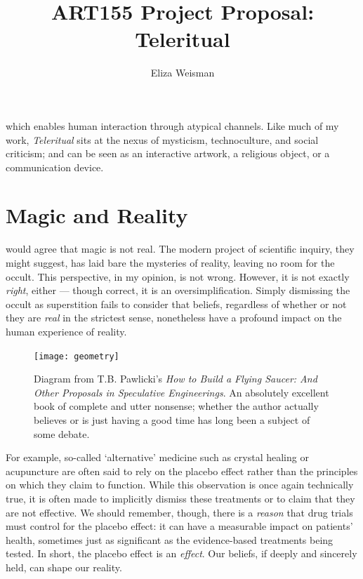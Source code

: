 \documentclass[a4paper,nobib]{tufte-handout}
\title[Teleritual]{\textbf{ART155 Project Proposal:} Teleritual}
\author{Eliza Weisman}
\begin{document}
\maketitle

 which enables human interaction through atypical channels. Like much of my work, \textit{Teleritual} sits at the nexus of mysticism, technoculture, and social criticism; and can be seen as an interactive artwork, a religious object, or a communication device.


\section{Magic and Reality}

 would agree that magic is not real. The modern project of scientific inquiry, they might suggest, has laid bare the mysteries of reality, leaving no room for the occult. This perspective, in my opinion, is not wrong. However, it is not exactly \emph{right}, either --- though correct, it is an oversimplification. Simply dismissing the occult as superstition fails to consider that beliefs, regardless of whether or not they are \emph{real} in the strictest sense, nonetheless have a profound impact on the human experience of reality.

\begin{figure}
    \texttt{[image: geometry]}
    \caption{Diagram from T.B. Pawlicki's \emph{How to Build a Flying Saucer: And Other Proposals in Speculative Engineerings}. An absolutely excellent book of complete and utter nonsense; whether the author actually believes or is just having a good time has long been a subject of some debate.}
    \label{fig:geom}
\end{figure}

For example, so-called `alternative' medicine such as crystal healing or acupuncture are often said to rely on the placebo effect rather than the principles on which they claim to function. While this observation is once again technically true, it is often made to implicitly dismiss these treatments or to claim that they are not effective.  We should remember, though, there is a \emph{reason} that drug trials must control for the placebo effect: it can have a measurable impact on patients' health, sometimes just as significant as the evidence-based treatments being tested. In short, the placebo effect is an \emph{effect}. Our beliefs, if deeply and sincerely held, can shape our reality.
\end{document}
